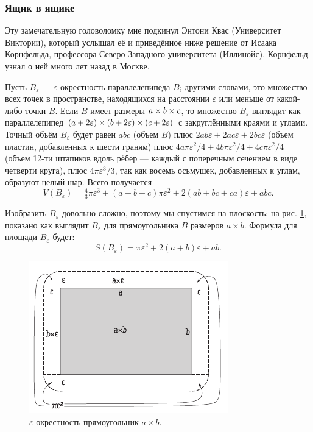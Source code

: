 \subsubsection*{Ящик в ящике}

Эту замечательную головоломку мне подкинул Энтони Квас (Университет Виктории), который услышал её и приведённое ниже решение от Исаака Корнфельда, профессора Северо-Западного университета (Иллинойс).
Корнфельд узнал о ней много лет назад в Москве.

Пусть $B_\varepsilon$ --- $\varepsilon$-окрестность параллелепипеда $B$;
другими словами, это множество всех точек в пространстве, находящихся на расстоянии $\varepsilon$ или меньше от какой-либо точки $B$.
Если $B$ имеет размеры $a \z\times b \z\times c$, то множество $B_\varepsilon$ выглядит как параллелепипед $(a + 2\varepsilon) \z\times (b + 2\varepsilon) \z\times (c + 2\varepsilon)$ с закруглёнными краями и углами.
Точный объём $B_\varepsilon$ будет равен
$abc$ (объем $B$)
плюс $2ab\varepsilon + 2ac\varepsilon + 2bc\varepsilon$ (объем пластин, добавленных к шести граням)
плюс $4a\pi\varepsilon^2 /4 + 4b\pi\varepsilon^2 /4 + 4c\pi\varepsilon^2 /4$ (объем 12-ти штапиков вдоль рёбер --- каждый с поперечным сечением в виде четверти круга),
плюс $4\pi\varepsilon^3 /3$, так как восемь осьмушек, добавленных к углам, образуют целый шар.
Всего получается
\[V(B_\varepsilon)=\tfrac43\pi\varepsilon^3+(a+b+c)\pi\varepsilon^2+2(ab+bc+ca)\varepsilon+abc.\]

Изобразить $B_\varepsilon$ довольно сложно, поэтому мы спустимся на плоскость;
на рис. \ref{pic:box}, показано как выглядит $B_\varepsilon$ для прямоугольника $B$ размеров $a \times b$.
Формула для площади $B_\varepsilon$ будет:
\[S(B_\varepsilon)=\pi\varepsilon^2+2(a+b)\varepsilon+ab.\]

\begin{figure}[ht!]
\centering
\includegraphics[scale=1]{pics/box}
\caption{$\varepsilon$-окрестность прямоугольник $a \times b$.}
\label{pic:box}
\end{figure}

